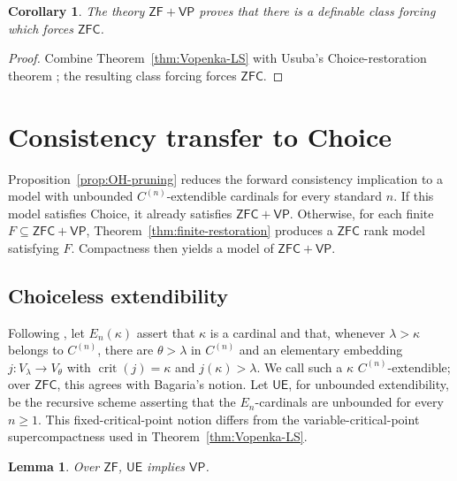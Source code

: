 \documentclass[11pt,a4paper]{amsart}
\newcommand{\VP}{\mathsf{VP}}
\newcommand{\ZF}{\mathsf{ZF}}
\newcommand{\ZFC}{\mathsf{ZFC}}
\newcommand{\crit}{\operatorname{crit}}
\newcommand{\UE}{\mathsf{UE}}
\theoremstyle{plain}
\newtheorem{lemma}[theorem]{Lemma}
\newtheorem{corollary}[theorem]{Corollary}
\theoremstyle{definition}
\theoremstyle{remark}
\begin{document}
\begin{corollary}\label{cor:class-force-ZFC}
The theory $\ZF+\VP$ proves that there is a definable class forcing which forces $\ZFC$.
\end{corollary}

\begin{proof}
Combine Theorem~\ref{thm:Vopenka-LS} with Usuba's Choice-restoration theorem \cite[Corollary~4.8]{Usuba}; the resulting class forcing forces $\ZFC$.
\end{proof}
\endgroup

\begingroup

\section{Consistency transfer to Choice}\label{sec:consistency-transfer}

Proposition~\ref{prop:OH-pruning} reduces the forward consistency implication to a model with unbounded $C^{(n)}$-extendible cardinals for every standard $n$.  If this model satisfies Choice, it already satisfies $\ZFC+\VP$.  Otherwise, for each finite $F\subseteq\ZFC+\VP$, Theorem~\ref{thm:finite-restoration} produces a $\ZFC$ rank model satisfying $F$.  Compactness then yields a model of $\ZFC+\VP$.

\subsection*{{Choiceless extendibility}}

Following \cite[Definition~6.6]{Mohammd}, let $E_n(\kappa)$ assert that $\kappa$ is a cardinal and that, whenever $\lambda>\kappa$ belongs to $C^{(n)}$, there are $\theta>\lambda$ in $C^{(n)}$ and an elementary embedding $j:V_\lambda\to V_\theta$ with $\crit(j)=\kappa$ and $j(\kappa)>\lambda$.  We call such a $\kappa$ $C^{(n)}$-extendible; over $\ZFC$, this agrees with Bagaria's notion.  Let $\UE$, for unbounded extendibility, be the recursive scheme asserting that the $E_n$-cardinals are unbounded for every $n\geq1$.
This fixed-critical-point notion differs from the variable-critical-point supercompactness used in Theorem~\ref{thm:Vopenka-LS}.

\begin{lemma}\label{lem:OH-VP}
Over $\ZF$, $\UE$ implies $\VP$.
\end{lemma}
\end{document}
